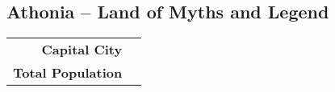 \subsection{Athonia -- Land of Myths and Legend}
\begin{tabular}{r | l}
    \textbf{Capital City} & \\
    \textbf{Total Population} & 
\end{tabular}